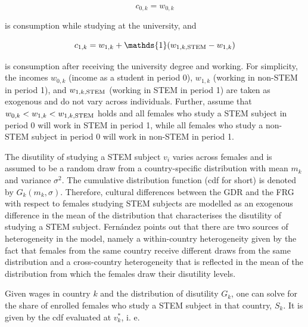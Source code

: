 \documentclass[a4paper, oneside, hyperfootnotes = false]{article}
\begin{document}
{\vspace{-8mm}

\begin{equation*}
	\label{eq:c0k}
	c_{0,k} = w_{0,k}
\end{equation*}

\noindent is consumption while studying at the university, and 

\vspace{-8mm}

\begin{equation*}
	\label{eq:c1k}
	c_{1,k} = w_{1,k} + \mathds{1}(w_{1,k,\textnormal{STEM}} - w_{1,k})
\end{equation*}

\noindent is consumption after receiving the university degree and working.
For simplicity, the incomes $w_{0,k}$ (income as a student in period 0), $w_{1,k}$ (working in non-STEM in period 1), and $w_{1,k,\textnormal{STEM}}$ (working in STEM in period 1) are taken as exogenous and do not vary across individuals.
Further, assume that $w_{0,k} < w_{1,k} < w_{1,k,\textnormal{STEM}}$ holds and all females who study a STEM subject in period 0 will work in STEM in period 1, while all females who study a non-STEM subject in period 0 will work in non-STEM in period 1.

The disutility of studying a STEM subject $v_{i}$ varies across females and is assumed to be a random draw from a country-specific distribution with mean $m_{k}$ and variance $\sigma^{2}$.
The cumulative distribution function (cdf for short) is denoted by $G_{k}(m_{k}, \sigma)$.
Therefore, cultural differences between the GDR and the FRG with respect to females studying STEM subjects are modelled as an exogenous difference in the mean of the distribution that characterises the disutility of studying a STEM subject.
Fernández points out that there are two sources of heterogeneity in the model, namely a within-country heterogeneity given by the fact that females from the same country receive different draws from the same distribution and a cross-country heterogeneity that is reflected in the mean of the distribution from which the females draw their disutility levels.

Given wages in country $k$ and the distribution of disutility $G_{k}$, one can solve for the share of enrolled females who study a STEM subject in that country, $S_{k}$. It is given by the cdf evaluated at $v^{*}_{k}$, i. e.

\vspace{-8mm}

}
\end{document}
